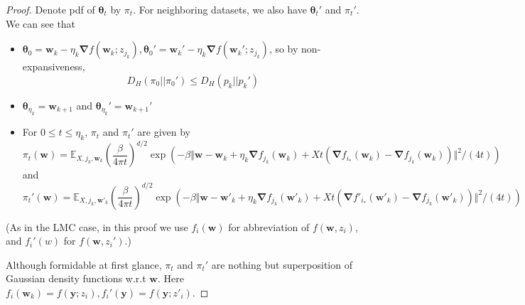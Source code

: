 \documentclass[final,12pt]{colt2018} %
\newcommand{\w}{\bm{w}}
\begin{document}
\begin{proof}
Denote pdf of $\bm{\theta}_t$ by $\pi_t$. For neighboring datasets, we also have $\bm{\theta}_t'$ and $\pi_t'$. We can see that
\begin{itemize}
  \item $\bm{\theta}_0=\bm{w}_k-\eta_k\bm{\nabla} f(\bm{w}_k;z_{j_k}),\bm{\theta}_0'=\bm{w}_k'-\eta_k\bm{\nabla} f(\bm{w}_k';z_{j_k})$, so by non-expansiveness,
  \begin{equation}
    D_H(\pi_0||\pi_0')\le D_H(p_k||p_k')
  \end{equation}
  \item $\bm{\theta}_{\eta_k}=\bm{w}_{k+1}$ and $\bm{\theta}_{\eta_k}'=\bm{w}_{k+1}'$
  \item For $0\le t\le \eta_k$, $\pi_t$ and $\pi_t'$ are given by
  \begin{equation}
    \pi_t(\bm{w})=\mathbb{E}_{X,j_k,\bm{w}_k}\left(\frac{\beta}{4\pi t}\right)^{d/2}\exp(-\beta\Vert\bm{w}-\bm{w}_k+\eta_k\bm{\nabla}f_{j_k}(\bm{w}_k)+Xt(\bm{\nabla} f_{i_*}(\bm{w}_k)-\bm{\nabla} f_{j_k}(\bm{w}_k))\Vert^2/(4 t))
  \end{equation}
  and
  \begin{equation}
    \pi_t'(\bm{w})=\mathbb{E}_{X,j_k,\bm{w}'_k}\left(\frac{\beta}{4\pi t}\right)^{d/2}\exp(-\beta\Vert\bm{w}-\bm{w}'_k+\eta_k\bm{\nabla}f_{j_k}(\bm{w}'_k)+Xt(\bm{\nabla} f'_{i_*}(\bm{w}'_k)-\bm{\nabla} f_{j_k}(\bm{w}'_k))\Vert^2/(4 t))
  \end{equation}
\end{itemize}
(As in the LMC case, in this proof we use $f_i(\w)$ for abbreviation of $f(\w,z_i)$, and $f_i'(w)$ for $f(\w,z_i')$.)


Although formidable at first glance, $\pi_t$ and $\pi_t'$ are nothing but superposition of Gaussian density functions w.r.t $\bm{w}$. Here $f_{i}(\bm{w}_k)=f(\bm{y};z_{i}),f_{i}'(\bm{y})=f(\bm{y};z'_{i})$.


\end{proof}
\end{document}
